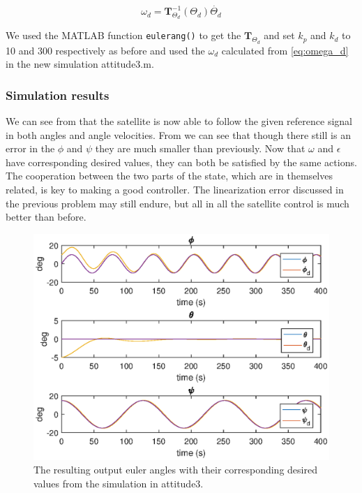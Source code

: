 \begin{equation}
    \omega_d = \mathbf{T}_{\Theta_d}^{-1}(\Theta_d)\dot{\Theta_d}
    \label{eq:omega_d}
\end{equation}

We used the MATLAB function \texttt{eulerang()} to get the $\mathbf{T}_{\Theta_d}$ and set $k_p$ and $k_d$ to 10 and 300 respectively as before and used the $\omega_d$ calculated from \eqref{eq:omega_d} in the new simulation {\color{blue} attitude3.m}.

\subsubsection*{Simulation results}

We can see from  that the satellite is now able to follow the given reference signal in both angles and angle velocities. From  we can see that though there still is an error in the $\phi$ and $\psi$ they are much smaller than previously. Now that $\omega$ and $\epsilon$ have corresponding desired values, they can both be satisfied by the same actions. The cooperation between the two parts of the state, which are in themselves related, is key to making a good controller. The linearization error discussed in the previous problem may still endure, but all in all the satellite control is much better than before.

\begin{figure}
	\centering
	\includegraphics[width=1.00\textwidth]{figures/3_euler.eps}
	\caption{The resulting output euler angles with their corresponding desired values from the simulation in attitude3.}
\label{fig:sim_attitude3_euler}
\end{figure}

